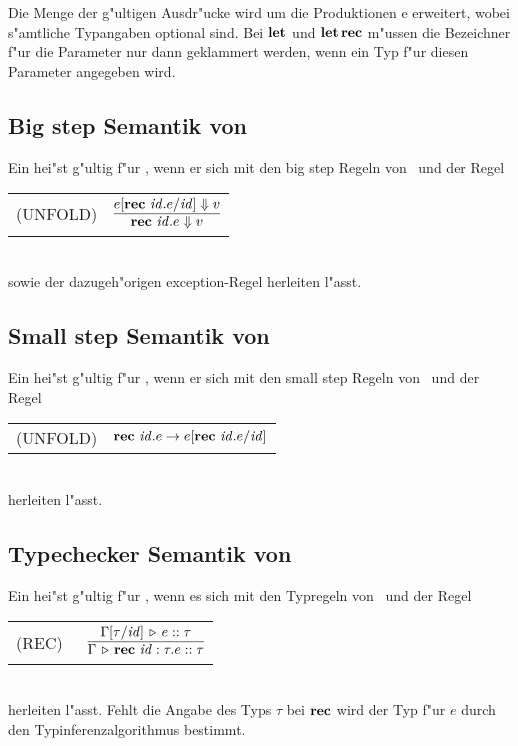 Die Menge \notation{$\Exp$} der g"ultigen Ausdr"ucke wird um die Produktionen
\bgram
e \is {}
  \al {}
  \al {}
\egram
erweitert, wobei s"amtliche Typangaben optional sind. Bei $\textbf{let}$ und $\textbf{let}\,\textbf{rec}$ m"ussen die Bezeichner f"ur die
Parameter nur dann geklammert werden, wenn ein Typ f"ur diesen Parameter angegeben wird.


\subsection{Big step Semantik von \LTWO}

Ein  hei"st g"ultig f"ur \LTWO, wenn er sich mit den big step Regeln von \LONE\ und der Regel\\[3mm]
  \begin{tabular}{ll}
    \mbox{(UNFOLD)}      & $\regel{e[\rec{\id}{e}/\id] \eval v}
                                  {\rec{\id}{e} \eval v}$
  \end{tabular}\\[7mm]
sowie der dazugeh"origen exception-Regel herleiten l"asst.


\subsection{Small step Semantik von \LTWO}

Ein  hei"st g"ultig f"ur \LTWO, wenn er sich mit den small step Regeln von \LONE\ und der Regel\\[3mm]
  \begin{tabular}{ll}
    \mbox{(UNFOLD)}     & $\textbf{rec}\ {\text{\it id\/}}.e \to e[\textbf{rec}\ {\text{\it id\/}}.e/{\text{\it id\/}}]$
  \end{tabular}\\[7mm]
herleiten l"asst.


\subsection{Typechecker Semantik von \LTWO}

Ein  hei"st g"ultig f"ur \LTWO, wenn es sich mit den Typregeln von \LONE\ und der Regel\\[3mm]
\begin{tabular}{ll}
\mbox{(REC)\ } & $\regel{\Tj{\Gamma[\tau/\id]}{e}{\tau}} 
                         {\Tj{\Gamma}{\rec{\id:\tau}{e}}{\tau}}$
\end{tabular}\\[7mm]
herleiten l"asst. Fehlt die Angabe des Typs $\tau$ bei $\textbf{rec}$ wird der Typ f"ur $e$ durch den Typinferenzalgorithmus
bestimmt.

